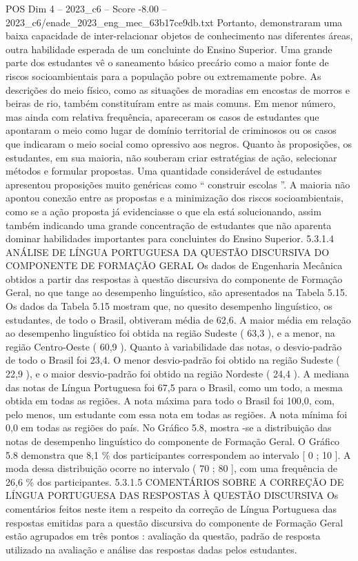 \begin{textsample}{POS Dim 4 – 2023\_c6 – Score -8.00 – 2023\_c6/enade\_2023\_eng\_mec\_63b17ce9db.txt}
Portanto, demonstraram uma baixa capacidade de inter-relacionar objetos de conhecimento nas diferentes áreas, outra habilidade esperada de um concluinte do Ensino Superior.
Uma grande parte dos estudantes vê o saneamento básico precário como a maior fonte de riscos socioambientais para a população pobre ou extremamente pobre.
As descrições do meio físico, como as situações de moradias em encostas de morros e beiras de rio, também constituíram entre as mais comuns.
Em menor número, mas ainda com relativa frequência, apareceram os casos de estudantes que apontaram o meio como lugar de domínio territorial de criminosos ou os casos que indicaram o meio social como opressivo aos negros.
Quanto às proposições, os estudantes, em sua maioria, não souberam criar estratégias de ação, selecionar métodos e formular propostas.
Uma quantidade considerável de estudantes apresentou proposições muito genéricas como “ construir escolas ”.
A maioria não apontou conexão entre as propostas e a minimização dos riscos socioambientais, como se a ação proposta já evidenciasse o que ela está solucionando, assim também indicando uma grande concentração de estudantes que não aparenta dominar habilidades importantes para concluintes do Ensino Superior. 5.3.1.4 ANÁLISE DE LÍNGUA PORTUGUESA DA QUESTÃO DISCURSIVA DO COMPONENTE DE FORMAÇÃO GERAL Os dados de Engenharia Mecânica obtidos a partir das respostas à questão discursiva do componente de Formação Geral, no que tange ao desempenho linguístico, são apresentados na Tabela 5.15.
Os dados da Tabela 5.15 mostram que, no quesito desempenho linguístico, os estudantes, de todo o Brasil, obtiveram média de 62,6.
A maior média em relação ao desempenho linguístico foi obtida na região Sudeste ( 63,3 ), e a menor, na região Centro-Oeste ( 60,9 ).
Quanto à variabilidade das notas, o desvio-padrão de todo o Brasil foi 23,4.
O menor desvio-padrão foi obtido na região Sudeste ( 22,9 ), e o maior desvio-padrão foi obtido na região Nordeste ( 24,4 ).
A mediana das notas de Língua Portuguesa foi 67,5 para o Brasil, como um todo, a mesma obtida em todas as regiões.
A nota máxima para todo o Brasil foi 100,0, com, pelo menos, um estudante com essa nota em todas as regiões.
A nota mínima foi 0,0 em todas as regiões do país.
No Gráfico 5.8, mostra -se a distribuição das notas de desempenho linguístico do componente de Formação Geral.
O Gráfico 5.8 demonstra que 8,1 \% dos participantes correspondem ao intervalo [ 0 ; 10 ].
A moda dessa distribuição ocorre no intervalo ( 70 ; 80 ], com uma frequência de 26,6 \% dos participantes. 5.3.1.5 COMENTÁRIOS SOBRE A CORREÇÃO DE LÍNGUA PORTUGUESA DAS RESPOSTAS À QUESTÃO DISCURSIVA Os comentários feitos neste item a respeito da correção de Língua Portuguesa das respostas emitidas para a questão discursiva do componente de Formação Geral estão agrupados em três pontos : avaliação da questão, padrão de resposta utilizado na avaliação e análise das respostas dadas pelos estudantes.

\end{textsample}
